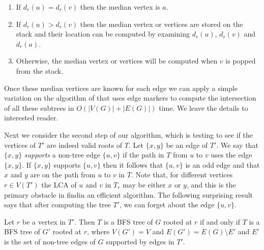 \documentclass[lotsofwhite]{patmorin}
\newcommand{\layer}{d}
\begin{document}
\begin{enumerate}
\item If $\layer_r(u)=\layer_r(v)$ then the median vertex is $a$.

\item If $\layer_r(u)>\layer_r(v)$ then the median vertex or vertices
are stored on the stack and their location can be computed by
examining $\layer_r(u)$, $\layer_r(v)$ and $\layer_r(a)$.

\item Otherwise, the median vertex or vertices will be computed when
$v$ is popped from the stack.
\end{enumerate}

Once these median vertices are known for each edge we can apply a
simple variation on the algorithm of  that uses
edge markers to compute the intersection of all these subtrees in
$O(|V(G)|+|E(G)|)$ time.  We leave the details to interested reader.

Next we consider the second step of our algorithm, which is testing to
see if the vertices of $T'$ are indeed valid roots of $T$.  Let
$\{x,y\}$ be an edge of $T'$.  We say that $\{x,y\}$ \emph{supports} a
non-tree edge $\{u,v\}$ if the path in $T$ from $u$ to $v$ uses the
edge $\{x,y\}$.  If $\{x,y\}$ supports $\{u,v\}$ then it follows that
$\{u,v\}$ is an odd edge and that $x$ and $y$ are on the path from $u$
to $v$ in $T$.  Note that, for different vertices $r\in V(T')$ the LCA
of $u$ and $v$ in $T_r$ may be either $x$ or $y$, and this is the
primary obstacle in findin an efficient algorithm.  The following
surprising result says that after computing the tree $T'$, we can
forget about the edge $\{u,v\}$.

\begin{lem}
Let $r$ be a vertex in $T'$.  Then $T$ is a BFS tree of $G$ rooted at
$r$ if and only if $T$ is a BFS tree of $G'$ rooted at $r$, where
$V(G')=V$ and $E(G')=E(G)\setminus E'$ and $E'$ is the set of non-tree
edges of $G$ supported by edges in $T'$.
\end{lem}
\end{document}
